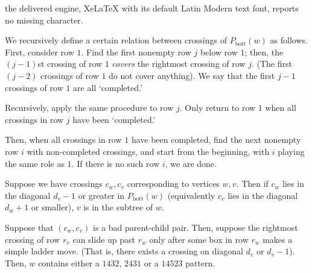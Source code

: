 \documentclass[10pt,a4paper]{amsart}
\begin{document}
the delivered engine, XeLaTeX with its default Latin Modern text font, reports no missing character.
\begin{definition}\label{definition:matching}
   We recursively define a certain relation between crossings of $P_{\text{bott}}(w)$ as follows. First, consider row $1$. Find the first nonempty row $j$ below row $1$; then, the $(j-1)$st crossing of row $1$ \textit{covers} the rightmost crossing of row $j$. (The first $(j-2)$ crossings of row $1$ do not cover anything). We say that the first $j-1$ crossings of row $1$ are all `completed.'  

   Recursively, apply the same procedure to row $j$. Only return to row $1$ when all crossings in row $j$ have been `completed.' 
   
    Then, when all crossings in row $1$ have been completed, find the next nonempty row $i$ with non-completed crossings, and start from the beginning, with $i$ playing the same role as $1$. If there is no such row $i$, we are done. 
\end{definition}

\begin{remark}\label{rmk:diagonalremark}
Suppose we have crossings $c_w,c_v$ corresponding to vertices $w,v$. Then if $c_w$ lies in the diagonal $d_v-1$ or greater in $P_{\text{bott}}(w)$ (equivalently $c_v$ lies in the diagonal $d_w+1$ or smaller), $v$ is in the subtree of $w$. 
\end{remark}

\begin{lemma}\label{lemma:sufficientcase2}
    Suppose that $(c_w,c_v)$ is a bad parent-child pair. Then, suppose the rightmost crossing of row $r_v$ can slide up past $r_w$ only after some box in row $r_w$ makes a simple ladder move. (That is, there exists a crossing on diagonal $d_v$ or $d_{v}-1$). Then, $w$ contains either a $1432$, $2431$ or a $14523$ pattern.
\end{lemma}
\end{document}
